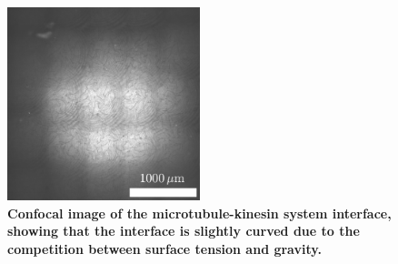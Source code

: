 \documentclass[%
10pt,
superscriptaddress,
 amsmath,amssymb,
 aps,prx,
]{revtex4-2}
\begin{document}
\begin{figure}[!h]
    \includegraphics[width=0.5\textwidth]{a6-curved-interface}
    \caption{
    \textbf{Confocal image of the microtubule-kinesin system interface, showing that the interface is slightly curved due to the competition between surface tension and gravity.}
    }
    \label{fig:curved-interface}
\end{figure}
\end{document}
